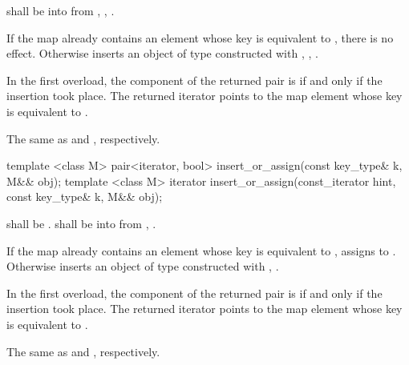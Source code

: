 \begin{itemdescr}
\pnum
\requires
{} shall be  into 
from , ,
.

\pnum
\effects
If the map already contains an element
whose key is equivalent to ,
there is no effect.
Otherwise inserts an object of type 
constructed with , ,
.

\pnum
\returns
In the first overload,
the  component of the returned pair is 
if and only if the insertion took place.
The returned iterator points to the map element
whose key is equivalent to .

\pnum
\complexity
The same as  and ,
respectively.
\end{itemdescr}

%
%
\begin{itemdecl}
template <class M> pair<iterator, bool> insert_or_assign(const key_type& k, M&& obj);
template <class M> iterator insert_or_assign(const_iterator hint, const key_type& k, M&& obj);
\end{itemdecl}

\begin{itemdescr}
\pnum
\requires
{} shall be .
 shall be  into 
from , .

\pnum
\effects
If the map already contains an element 
whose key is equivalent to ,
assigns  to .
Otherwise inserts an object of type 
constructed with , .

\pnum
\returns
In the first overload,
the  component of the returned pair is 
if and only if the insertion took place.
The returned iterator points to the map element
whose key is equivalent to .

\pnum
\complexity
The same as  and ,
respectively.
\end{itemdescr}

